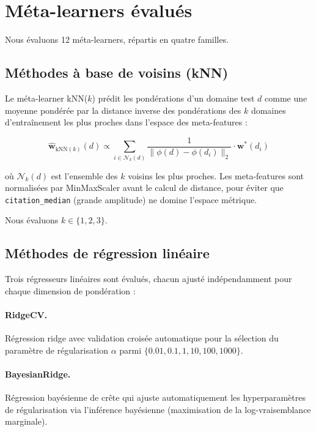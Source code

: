 \section{Méta-learners évalués}
\label{sec:meta_learners}

Nous évaluons 12 méta-learners, répartis en quatre familles.

\subsection{Méthodes à base de voisins (kNN)}

Le méta-learner kNN($k$) prédit les pondérations d'un domaine test $d$
comme une moyenne pondérée par la distance inverse des pondérations des
$k$ domaines d'entraînement les plus proches dans l'espace des meta-features :

\begin{equation}
  \hat{\mathbf{w}}_{\text{kNN}(k)}(d) \propto
  \sum_{i \in \mathcal{N}_k(d)} \frac{1}{\|\phi(d) - \phi(d_i)\|_2}
  \cdot \mathbf{w}^*(d_i)
  \label{eq:knn_prediction}
\end{equation}

où $\mathcal{N}_k(d)$ est l'ensemble des $k$ voisins les plus proches.
Les meta-features sont normalisées par MinMaxScaler avant le calcul de
distance, pour éviter que \texttt{citation\_median} (grande amplitude)
ne domine l'espace métrique.

Nous évaluons $k \in \{1, 2, 3\}$.

\subsection{Méthodes de régression linéaire}

Trois régresseurs linéaires sont évalués, chacun ajusté indépendamment
pour chaque dimension de pondération :

\paragraph{RidgeCV.} Régression ridge avec validation croisée automatique
pour la sélection du paramètre de régularisation $\alpha$ parmi
$\{0.01, 0.1, 1, 10, 100, 1000\}$.

\paragraph{BayesianRidge.} Régression bayésienne de crête qui ajuste
automatiquement les hyperparamètres de régularisation via l'inférence
bayésienne (maximisation de la log-vraisemblance marginale).


